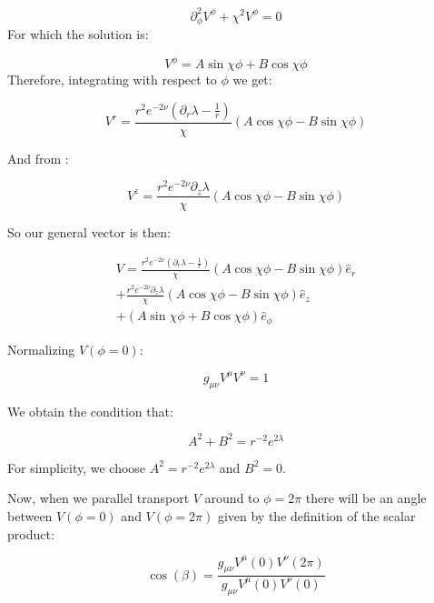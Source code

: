 \documentclass{article}
\begin{document}
\begin{equation}
\partial^2_\phi V^\phi+\chi^2 V^\phi=0
\end{equation}
For which the solution is:

\begin{equation}
V^{\phi}=A\sin\chi\phi+B\cos\chi\phi
\end{equation}
Therefore, integrating  with respect to $\phi$ we get:

\begin{equation}
V^{r}=\frac{r^2e^{-2\nu}(\partial_r\lambda-\frac{1}{r})}{\chi}\left(A\cos\chi\phi-B\sin\chi\phi\right)
\end{equation}

And from :

\begin{equation}
V^{z}=\frac{r^2 e^{-2\nu}\partial_z\lambda}{\chi}\left(A\cos\chi\phi-B\sin\chi\phi\right)
\end{equation}

So our general vector is then:

\begin{equation}
\label{eq:V-from-par-transport}
\begin{split}
V=\frac{r^2e^{-2\nu}(\partial_r\lambda-\frac{1}{r})}{\chi}\left(A\cos\chi\phi-B\sin\chi\phi\right)\hat{e}_{r} \\
+\frac{r^2 e^{-2\nu}\partial_z\lambda}{\chi}\left(A\cos\chi\phi-B\sin\chi\phi\right)\hat{e}_{z} \\
+\left(A\sin\chi\phi+B\cos\chi\phi\right)\hat{e}_{\phi}
\end{split}
\end{equation}

Normalizing $V(\phi=0)$:

\begin{equation}
\label{eq:inner-product}
g_{\mu\nu}V^{\mu}V^{\nu}=1
\end{equation}

We obtain the condition that:

\begin{equation}
A^2+B^2=r^{-2}e^{2\lambda}
\end{equation}

For simplicity, we choose $A^2=r^{-2}e^{2\lambda}$ and $B^2=0$. 

Now, when we parallel transport $V$ around to $\phi=2\pi$ there will be an angle between $V(\phi=0)$ and $V(\phi=2\pi)$ given by the definition of the scalar product:

\begin{equation}
\cos(\beta)=\frac{g_{\mu\nu}V^{\mu}(0)V^{\nu}(2\pi)}{g_{\mu\nu}V^{\mu}(0)V^{\nu}(0)}
\end{equation}
\end{document}
